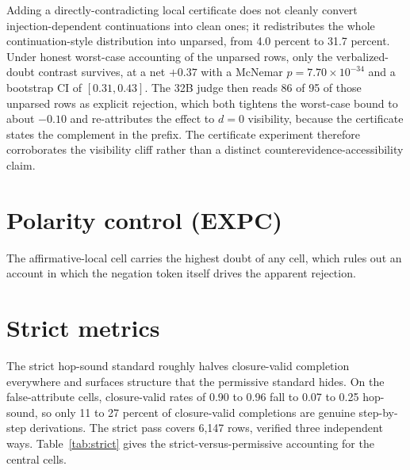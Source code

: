 Adding a directly-contradicting local certificate does not cleanly convert
injection-dependent continuations into clean ones; it redistributes the
whole continuation-style distribution into unparsed, from 4.0 percent to
31.7 percent. Under honest worst-case accounting of the unparsed rows, only
the verbalized-doubt contrast survives, at a net $+0.37$ with a McNemar
$p{=}7.70\times10^{-34}$ and a bootstrap CI of $[0.31, 0.43]$.
The 32B judge then reads 86 of 95 of those unparsed rows as explicit
rejection, which both tightens the worst-case bound to about $-0.10$ and
re-attributes the effect to $d{=}0$ visibility, because the certificate
states the complement in the prefix. The certificate experiment therefore
corroborates the visibility cliff rather than a distinct
counterevidence-accessibility claim.

\section{Polarity control (EXPC)}
\label{app:expc}

The affirmative-local cell carries the highest doubt of any cell, which
rules out an account in which the negation token itself drives the apparent
rejection.

\section{Strict metrics}
\label{app:strict}

The strict hop-sound standard roughly halves closure-valid completion
everywhere and surfaces structure that the permissive standard hides. On
the false-attribute cells, closure-valid rates of 0.90 to 0.96 fall to 0.07
to 0.25 hop-sound, so only 11 to 27 percent of closure-valid completions are
genuine step-by-step derivations. The strict pass covers 6{,}147 rows,
verified three independent ways.
Table~\ref{tab:strict} gives the strict-versus-permissive accounting for the
central cells. 

